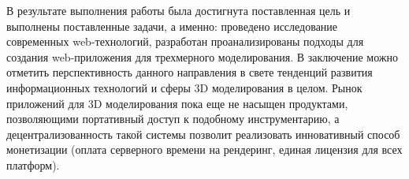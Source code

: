 В результате выполнения работы была достигнута поставленная цель и выполнены поставленные задачи, а именно: проведено исследование современных web-технологий,
разработан проанализированы подходы для создания web-приложения для трехмерного моделирования. В заключение можно отметить перспективность данного направления
в свете тенденций развития информационных технологий и сферы 3D моделирования в целом. Рынок приложений для 3D моделирования пока еще не насыщен продуктами,
позволяющими портативный доступ к подобному инструментарию, а децентрализованность такой системы позволит реализовать инновативный способ монетизации (оплата
серверного времени на рендеринг, единая лицензия для всех платформ).